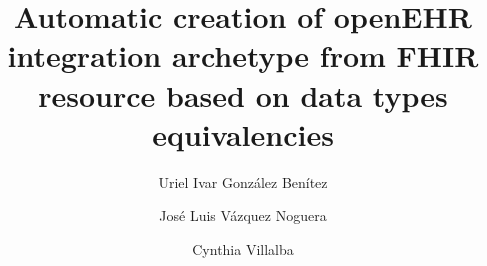 \title{Automatic creation of openEHR integration archetype from FHIR resource based on data types equivalencies}

\author{Uriel Ivar González Benítez}

\author{José Luis Vázquez Noguera}

\author{Cynthia Villalba}
